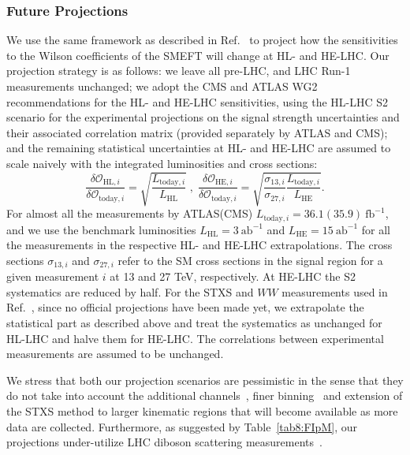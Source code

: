 \documentclass[../report.tex]{subfiles}
\begin{document}
\subsubsection{Future Projections}
\label{sec8:proj}
We use the same framework as described in Ref.~\cite{Ellis:2018gqa} to project how the sensitivities to the Wilson coefficients of the SMEFT will change at HL- and HE-LHC. Our projection strategy is as follows:
we leave all pre-LHC, and LHC Run-1 measurements unchanged; we adopt the CMS and ATLAS WG2 recommendations for the HL- and HE-LHC sensitivities, using the HL-LHC S2 scenario for the experimental projections on the signal strength uncertainties and their associated correlation matrix (provided separately by ATLAS and CMS);
and the remaining statistical uncertainties at HL- and HE-LHC are assumed to scale naively with the integrated luminosities and cross sections:
\begin{equation}
\frac{\delta\mathcal{O}_{\text{HL}, i}}{\delta\mathcal{O}_{\text{today}, i}} = \sqrt{\frac{L_{\text{today}, i}}{L_{\text{HL}}}} \; , \;
\frac{\delta\mathcal{O}_{\text{HE}, i}}{\delta\mathcal{O}_{\text{today}, i}} = \sqrt{\frac{\sigma_{13, i}}{\sigma_{27, i}} \frac{L_{\text{today}, i}}{L_{\text{HE}}}}  . \nonumber
\end{equation}
For almost all the measurements by ATLAS(CMS) $L_{\text{today}, i} = 36.1(35.9)~\text{fb}^{-1}$,
and we use the benchmark luminosities $L_{\text{HL}} = 3~\text{ab}^{-1}$ and $L_{\text{HE}} = 15~\text{ab}^{-1}$ for all the measurements in the respective HL- and HE-LHC extrapolations.
The cross sections $\sigma_{13, i}$ and $\sigma_{27, i}$ refer to the SM cross sections in the signal region for a given measurement $i$ at 13 and 27 TeV, respectively. At HE-LHC the S2 systematics are reduced by half. For the STXS and $WW$ measurements used in Ref.~\cite{Ellis:2018gqa}, since no official projections have been made yet, we extrapolate the statistical part as described above and treat the systematics as unchanged for HL-LHC and halve them for HE-LHC. The correlations between experimental measurements are assumed to be unchanged.

We stress that both our projection scenarios are pessimistic in the sense that they do not take into account the additional channels~\cite{gilbert:talk}, finer binning~\cite{deFlorian:2016spz, Hays:2290628, ATLAS-CONF-2017-047} and extension of the STXS method to larger kinematic regions that will become available as more data are collected.
Furthermore, as suggested by Table~\ref{tab8:FIpM}, our projections under-utilize LHC diboson scattering measurements~\cite{Azatov:2017kzw, Franceschini:2017xkh, Dawson:2018dcd}. 
\end{document}
